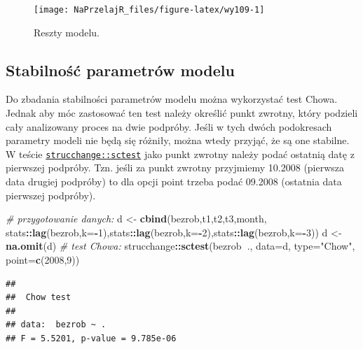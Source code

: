 \documentclass[polish,]{book}
\newenvironment{Shaded}{\begin{snugshade}}{\end{snugshade}}
\newcommand{\CommentTok}[1]{\textcolor[rgb]{0.56,0.35,0.01}{\textit{#1}}}
\newcommand{\DataTypeTok}[1]{\textcolor[rgb]{0.13,0.29,0.53}{#1}}
\newcommand{\DecValTok}[1]{\textcolor[rgb]{0.00,0.00,0.81}{#1}}
\newcommand{\KeywordTok}[1]{\textcolor[rgb]{0.13,0.29,0.53}{\textbf{#1}}}
\newcommand{\NormalTok}[1]{#1}
\newcommand{\OperatorTok}[1]{\textcolor[rgb]{0.81,0.36,0.00}{\textbf{#1}}}
\newcommand{\StringTok}[1]{\textcolor[rgb]{0.31,0.60,0.02}{#1}}
\begin{document}
\begin{figure}[h]

{\centering \texttt{[image: NaPrzelajR\_files/figure-latex/wy109-1]} 

}

\caption{Reszty modelu.}\label{fig:wy109}
\end{figure}

\hypertarget{part_10.4.4}{%
\subsection{Stabilność parametrów modelu}\label{part_10.4.4}}

Do zbadania stabilności parametrów modelu można wykorzystać test Chowa. Jednak aby móc zastosować ten test należy określić punkt zwrotny, który podzieli cały
analizowany proces na dwie podpróby. Jeśli w tych dwóch podokresach parametry modeli nie będą się różniły, można wtedy przyjąć, że są one stabilne. W teście
\href{https://rdrr.io/cran/strucchange/man/sctest.html}{\texttt{strucchange::sctest}} jako punkt zwrotny należy podać ostatnią datę z pierwszej
podpróby. Tzn. jeśli za punkt zwrotny przyjmiemy 10.2008 (pierwsza data drugiej
podpróby) to dla opcji point trzeba podać 09.2008 (ostatnia data pierwszej podpróby).

\begin{Shaded}
\begin{Highlighting}[]
\CommentTok{# przygotowanie danych:}
\NormalTok{d <-}\StringTok{ }\KeywordTok{cbind}\NormalTok{(bezrob,t1,t2,t3,month,}
\NormalTok{  stats}\OperatorTok{::}\KeywordTok{lag}\NormalTok{(bezrob,}\DataTypeTok{k=}\OperatorTok{-}\DecValTok{1}\NormalTok{),stats}\OperatorTok{::}\KeywordTok{lag}\NormalTok{(bezrob,}\DataTypeTok{k=}\OperatorTok{-}\DecValTok{2}\NormalTok{),stats}\OperatorTok{::}\KeywordTok{lag}\NormalTok{(bezrob,}\DataTypeTok{k=}\OperatorTok{-}\DecValTok{3}\NormalTok{))}
\NormalTok{d <-}\StringTok{ }\KeywordTok{na.omit}\NormalTok{(d)}
\CommentTok{# test Chowa:}
\NormalTok{strucchange}\OperatorTok{::}\KeywordTok{sctest}\NormalTok{(bezrob}\OperatorTok{~}\NormalTok{., }\DataTypeTok{data=}\NormalTok{d, }\DataTypeTok{type=}\StringTok{"Chow"}\NormalTok{, }\DataTypeTok{point=}\KeywordTok{c}\NormalTok{(}\DecValTok{2008}\NormalTok{,}\DecValTok{9}\NormalTok{))}
\end{Highlighting}
\end{Shaded}

\begin{verbatim}
## 
##  Chow test
## 
## data:  bezrob ~ .
## F = 5.5201, p-value = 9.785e-06
\end{verbatim}
\end{document}
